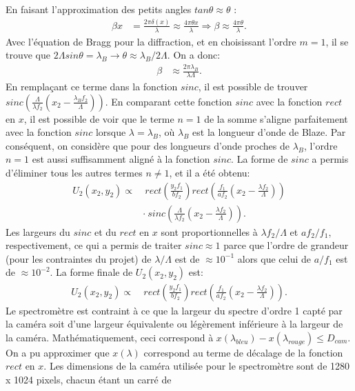 \documentclass[conference]{IEEEtran}
\begin{document}
En faisant l'approximation des petits angles $tan\theta\approx\theta$ :
\begin{align*}
   \beta x &=\frac{2\pi\delta(x)}{\lambda} \approx\frac{4\pi\theta x}{\lambda} \Rightarrow\beta\approx \frac{4\pi\theta}{\lambda}.
\end{align*} 
Avec l'équation de Bragg pour la diffraction, et en choisissant l'ordre $m=1$, il se trouve que $2\Lambda sin\theta=\lambda_B \rightarrow \theta\approx\lambda_B/2\Lambda$.
On a donc:
\begin{align*}
   \beta&\approx \frac{2\pi\lambda_B}{\lambda\Lambda}.
\end{align*}
En remplaçant ce terme dans la fonction $sinc$, il est possible de trouver $sinc(\frac{\Lambda}{\lambda f_2}(x_2-\frac{\lambda_B f_2}{\Lambda}))$. En comparant cette
fonction $sinc$ avec la fonction $rect$ en $x$, il est possible de voir que le terme $n=1$ de la somme s'aligne parfaitement 
avec la fonction $sinc$ lorsque $\lambda=\lambda_B$, où $\lambda_B$ est la longueur d'onde de Blaze. Par conséquent, on considère que pour des longueurs d'onde proches
de $\lambda_B$, l'ordre $n=1$ est aussi suffisamment aligné à la fonction $sinc$. La forme de $sinc$ a permis d'éliminer tous les autres termes $n\neq1$, et il a été obtenu:
\begin{align*}
    U_2(x_2,y_2)\propto&\ rect(\frac{y_2 f_1}{b f_2})rect(\frac{f_1}{a f_2}(x_2-\frac{\lambda f_2}{\Lambda}))\\
    & \cdot\ sinc(\frac{\Lambda}{\lambda f_2}(x_2-\frac{\lambda f_2}{\Lambda})).
\end{align*}
Les largeurs du $sinc$ et du $rect$ en $x$ sont proportionnelles à $\lambda f_2/\Lambda$ et $af_2/f_1$, respectivement, ce qui
a permis de traiter $sinc\approx1$ parce que l'ordre de grandeur (pour les contraintes du projet) de $\lambda/\Lambda$ est de $\approx10^{-1}$ alors que celui de $a/f_1$ est
de $\approx10^{-2}$. La forme finale de $U_2(x_2,y_2)$ est:
\begin{align*}
    U_2(x_2,y_2)\propto&\ rect(\frac{y_2 f_1}{b f_2})rect(\frac{f_1}{a f_2}(x_2-\frac{\lambda f_2}{\Lambda})).
\end{align*}
Le spectromètre est contraint à ce que la largeur du spectre d'ordre 1 capté par la caméra
soit d'une largeur équivalente ou légèrement inférieure à la largeur de la caméra. Mathématiquement, ceci correspond à
$x(\lambda_{bleu})-x(\lambda_{rouge})\leq D_{cam}$. On a pu approximer que $x(\lambda)$ correspond au terme de décalage
de la fonction $rect$ en $x$. Les dimensions de la caméra utilisée pour le spectromètre sont de 1280 x 1024 pixels, chacun étant un carré de
\end{document}
